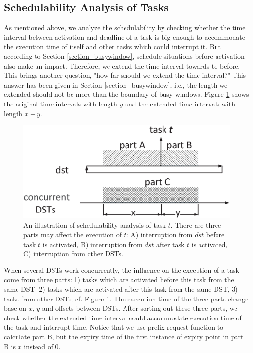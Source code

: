 \documentclass[conference]{IEEEtran}
\begin{document}
\subsection{Schedulability Analysis of Tasks}
As mentioned above, we analyze the schedulability by checking whether the time interval between activation and deadline of a task is big enough to accommodate the execution time of itself and other tasks which could interrupt it. But according to Section \ref{section_busywindow}, schedule situations before activation also make an impact. Therefore, we extend the time interval towards to before. This brings another question, "how far should we extend the time interval?" This answer has been given in Section \ref{section_busywindow}, i.e., the length we extended should not be more than the boundary of busy windows. Figure \ref{figure_3parts} shows the original time intervals with length $y$ and the extended time intervals with length $x+y$.
\begin{figure}
  \centering
  \includegraphics[scale=0.3]{graphics/figure_3parts.eps}
  \caption{An illustration of schedulability analysis of task $t$. There are three parts may affect the execution of $t$: A) interruption from $dst$ before task $t$ is activated, B) interruption from $dst$ after task $t$ is activated, C) interruption from other DSTs.}
  \label{figure_3parts}
\end{figure}

When several DSTs work concurrently, the influence on the execution of a task come from three parts: 1) tasks which are activated before this task from the same DST, 2) tasks which are activated after this task from the same DST, 3) tasks from other DSTs, cf. Figure \ref{figure_3parts}. The execution time of the three parts change base on $x$, $y$ and offsets between DSTs. After sorting out these three parts, we check whether the extended time interval could accommodate execution time of the task and interrupt time. Notice that we use prefix request function to calculate part B, but the expiry time of the first instance of expiry point in part B is $x$ instead of 0.
\end{document}
